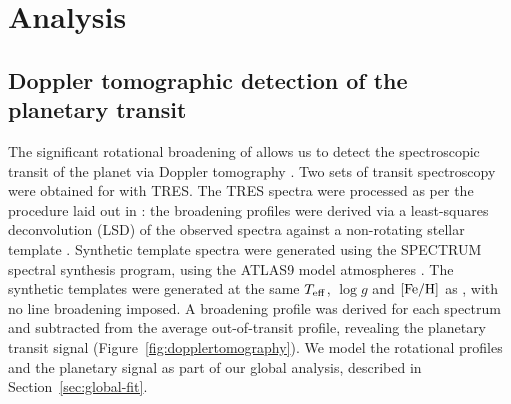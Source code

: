 \documentclass[apjl]{emulateapj}
\newcommand{\teff}{\ensuremath{T_{\rm eff}}}
\newcommand{\logg}{\ensuremath{\log{g}}}
\newcommand{\feh}{\ensuremath{\rm [Fe/H]}}
\begin{document}
\section{Analysis}
\label{sec:analysis}
\begin{comment}
\end{comment}


\subsection{Doppler tomographic detection of the planetary transit}
\label{sec:TRES_DT}

The significant rotational broadening of \hatcur{} allows us to detect the spectroscopic transit of the planet via Doppler tomography \citep{Collier:2010a,Collier:2010b}. Two sets of transit spectroscopy were obtained for \hatcurb{} with TRES. The TRES spectra were processed as per the procedure laid out in \citet{Zhou:2016}: the broadening profiles were derived via a least-squares deconvolution (LSD) of the observed spectra against a non-rotating stellar template \citep[as per ][]{Donati:1997}. Synthetic template spectra were generated using the SPECTRUM \citep{Gray:1994} spectral synthesis program, using the ATLAS9 model atmospheres \citep{Castelli:2004}. The synthetic templates were generated at the same \teff{}, \logg{} and \feh{} as \hatcur{}, with no line broadening imposed. A broadening profile was derived for each spectrum and subtracted from the average out-of-transit profile, revealing the planetary transit signal (Figure~\ref{fig:dopplertomography}). We model the rotational profiles and the planetary signal as part of our global analysis, described in Section~\ref{sec:global-fit}.

\begin{figure*}
\\

\caption{
Doppler tomographic signals for the spectroscopic transits of \hatcurb{} on 2016 Apr 17 (left) and 2016 May 16 (right). The top panels show the residual between the broadening kernel from each observation and that of the averaged out-of-transit broadening kernel. The transit can be seen as the dark streak running diagonally from bottom left (mid-transit) to top right (post-egress). The best fit models are plotted below, as are the residual after subtraction of the modeled planetary tomographic signal. The bottom panels show the reconstructed light curves from the Doppler tomographic observation. These are constructed by summing the signal under the Doppler tomographic `shadow' of the planet. The red line shows the expected signal from the photometric transit, agreeing with the transit depth modelled via Doppler tomography, eliminating potential blend scenarios for the system.
\label{fig:dopplertomography}}
\end{figure*}
\end{document}
